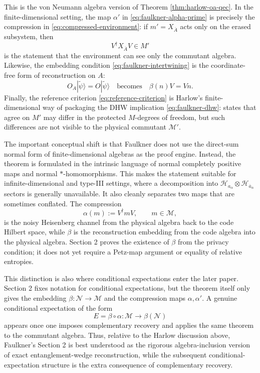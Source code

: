 \documentclass[11pt]{article}
\newcommand{\mH}{\mathcal{H}}
\newcommand{\mM}{\mathcal{M}}
\newcommand{\mN}{\mathcal{N}}
\newcommand{\barA}{\overline{A}}
\newcommand{\bara}{\overline{a}}
\newcommand{\ket}[1]{|#1\rangle}
\newcommand{\wt}[1]{\widetilde{#1}}
\begin{document}
This is the von Neumann algebra version of Theorem
\ref{thm:harlow-oa-qec}.  In the finite-dimensional setting, the map
\(\alpha'\) in \eqref{eq:faulkner-alpha-prime} is precisely the compression in
\eqref{eq:compressed-environment}: if \(m'=X_{\barA}\) acts only on the erased
subsystem, then
\[
    V^\dagger X_{\barA}V\in M'
\]
is the statement that the environment can see only the commutant algebra.
Likewise, the embedding condition \eqref{eq:faulkner-intertwining} is the
coordinate-free form of reconstruction on \(A\):
\[
    O_A\ket{\wt{\psi}}=O\ket{\wt{\psi}}
    \quad\text{becomes}\quad
    \beta(n)V=Vn .
\]
Finally, the reference criterion
\eqref{eq:reference-criterion} is Harlow's finite-dimensional way of packaging
the DHW implication \eqref{eq:faulkner-dhw}: states that agree on \(M'\) may
differ in the protected \(M\)-degrees of freedom, but such differences are not
visible to the physical commutant \(\mM'\).

The important conceptual shift is that Faulkner does not use the direct-sum
normal form of finite-dimensional algebras as the proof engine.  Instead, the
theorem is formulated in the intrinsic language of normal completely positive
maps and normal \(*\)-homomorphisms.  This makes the statement suitable for
infinite-dimensional and type-III settings, where a decomposition into
\(\mH_{a_\alpha}\otimes\mH_{\bara_\alpha}\) sectors is generally unavailable.
It also cleanly separates two maps that are sometimes conflated.  The
compression
\[
    \alpha(m):=V^\dagger mV,\qquad m\in\mM,
\]
is the noisy Heisenberg channel from the physical algebra back to the code
Hilbert space, while \(\beta\) is the reconstruction embedding from the code
algebra into the physical algebra.  Section 2 proves the existence of
\(\beta\) from the privacy condition; it does not yet require a Petz-map
argument or equality of relative entropies.

This distinction is also where conditional expectations enter the later
paper.  Section 2 fixes notation for conditional expectations, but the theorem
itself only gives the embedding \(\beta:\mN\to\mM\) and the compression maps
\(\alpha,\alpha'\).  A genuine conditional expectation of the form
\[
    E=\beta\circ\alpha:\mM\longrightarrow \beta(\mN)
\]
appears once one imposes complementary recovery and applies the same theorem
to the commutant algebra.  Thus, relative to the Harlow discussion above,
Faulkner's Section 2 is best understood as the rigorous algebra-inclusion
version of exact entanglement-wedge reconstruction, while the subsequent
conditional-expectation structure is the extra consequence of complementary
recovery.
\end{document}
